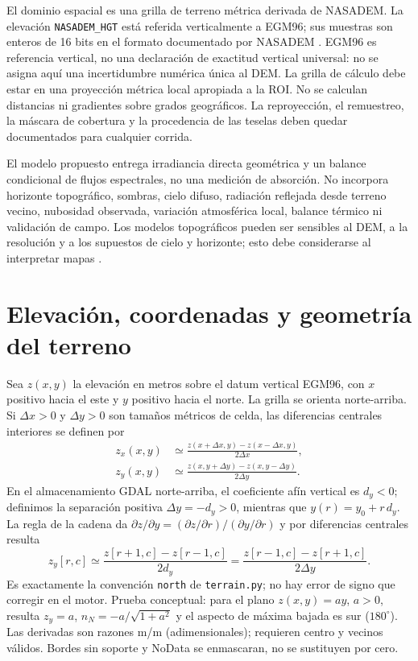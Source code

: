 \documentclass[11pt,a4paper]{article}
\begin{document}
El dominio espacial es una grilla de terreno métrica derivada de NASADEM. La elevación \texttt{NASADEM\_HGT} está referida verticalmente a EGM96; sus muestras son enteros de 16 bits en el formato documentado por NASADEM \cite{nasadem}. EGM96 es referencia vertical, no una declaración de exactitud vertical universal: no se asigna aquí una incertidumbre numérica única al DEM. La grilla de cálculo debe estar en una proyección métrica local apropiada a la ROI. No se calculan distancias ni gradientes sobre grados geográficos. La reproyección, el remuestreo, la máscara de cobertura y la procedencia de las teselas deben quedar documentados para cualquier corrida.

El modelo propuesto entrega irradiancia directa geométrica y un balance condicional de flujos espectrales, no una medición de absorción. No incorpora horizonte topográfico, sombras, cielo difuso, radiación reflejada desde terreno vecino, nubosidad observada, variación atmosférica local, balance térmico ni validación de campo. Los modelos topográficos pueden ser sensibles al DEM, a la resolución y a los supuestos de cielo y horizonte; esto debe considerarse al interpretar mapas \cite{dubayah1995}.

\section{Elevación, coordenadas y geometría del terreno}
Sea $z(x,y)$ la elevación en metros sobre el datum vertical EGM96, con $x$ positivo hacia el este y $y$ positivo hacia el norte. La grilla se orienta norte-arriba. Si $\Delta x>0$ y $\Delta y>0$ son tamaños métricos de celda, las diferencias centrales interiores se definen por
\begin{align}
 z_x(x,y)&\simeq\frac{z(x+\Delta x,y)-z(x-\Delta x,y)}{2\Delta x},\label{eq:zx}\\
 z_y(x,y)&\simeq\frac{z(x,y+\Delta y)-z(x,y-\Delta y)}{2\Delta y}.\label{eq:zy}
\end{align}
En el almacenamiento GDAL norte-arriba, el coeficiente afín vertical es $d_y<0$; definimos la separación positiva $\Delta y=-d_y>0$, mientras que $y(r)=y_0+r\,d_y$. La regla de la cadena da $\partial z/\partial y=(\partial z/\partial r)/(\partial y/\partial r)$ y por diferencias centrales resulta
\begin{equation}
 z_y[r,c]\simeq\frac{z[r+1,c]-z[r-1,c]}{2d_y}
 =\frac{z[r-1,c]-z[r+1,c]}{2\Delta y}.\label{eq:zy-raster}
\end{equation}
Es exactamente la convención \texttt{north} de \texttt{terrain.py}; no hay error de signo que corregir en el motor. Prueba conceptual: para el plano $z(x,y)=ay$, $a>0$, resulta $z_y=a$, $n_N=-a/\sqrt{1+a^2}$ y el aspecto de máxima bajada es sur ($180^\circ$). Las derivadas son razones m/m (adimensionales); requieren centro y vecinos válidos. Bordes sin soporte y NoData se enmascaran, no se sustituyen por cero.
\end{document}
